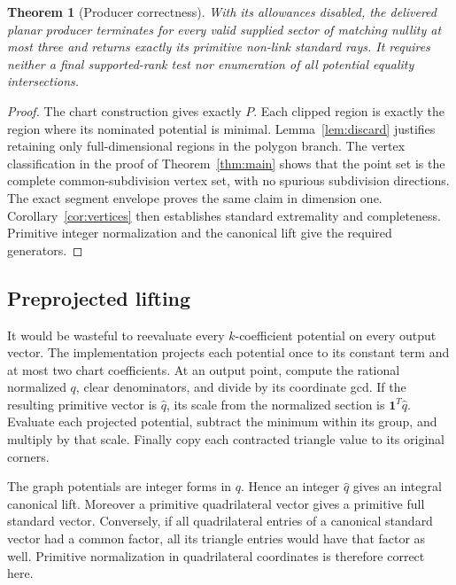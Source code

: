 \documentclass[11pt,letterpaper]{article}
\newtheorem{theorem}{Theorem}[section]
\theoremstyle{definition}
\theoremstyle{remark}\newtheorem{remark}[theorem]{Remark}
\begin{document}
\begin{theorem}[Producer correctness]
\label{thm:producer}
With its allowances disabled, the delivered planar producer terminates
for every valid supplied sector of matching nullity at most three and
returns exactly its primitive non-link standard rays. It requires neither
a final supported-rank test nor enumeration of all potential equality
intersections.
\end{theorem}

\begin{proof}
The chart construction gives exactly $P$. Each clipped region is exactly
the region where its nominated potential is minimal. Lemma~\ref{lem:discard}
justifies retaining only full-dimensional regions in the polygon branch.
The vertex classification in the proof of Theorem~\ref{thm:main} shows
that the point set is the complete common-subdivision vertex set, with no
spurious subdivision directions. The exact segment envelope proves the
same claim in dimension one. Corollary~\ref{cor:vertices} then establishes
standard extremality and completeness. Primitive integer normalization and
the canonical lift give the required generators.
\end{proof}

\subsection{Preprojected lifting}

It would be wasteful to reevaluate every $k$-coefficient potential on every
output vector. The implementation projects each potential once to its
constant term and at most two chart coefficients. At an output point,
compute the rational normalized $q$, clear denominators, and divide by its
coordinate gcd. If the resulting primitive vector is $\widehat q$, its
scale from the normalized section is $\mathbf1^T\widehat q$.
Evaluate each projected potential, subtract the minimum within its group,
and multiply by that scale. Finally copy each contracted triangle value
to its original corners.

The graph potentials are integer forms in $q$. Hence an integer
$\widehat q$ gives an integral canonical lift. Moreover a primitive
quadrilateral vector gives a primitive full standard vector. Conversely,
if all quadrilateral entries of a canonical standard vector had a common
factor, all its triangle entries would have that factor as well. Primitive
normalization in quadrilateral coordinates is therefore correct here.
\end{document}
